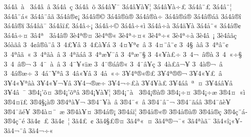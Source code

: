 {3^^e14^^e2^^a0^^e0^^a0
3^^e14^^e2^^a0^^e2
3^^e14^^e2^^a0^^e7
3^^e14^^e2^^a0^^f5
3^^e14^^e2^^a5^^af     
3^^e14^^e2^^a5^^e0^^a5^^a6
3^^e14^^e2^^a5^^e0^^f7^^a3
3^^e14^^e2^^a8^^a3
3^^e14^^e2^^a8^^a6
3^^e14^^e2^^a8^^e1^^ab
3^^e14^^e2^^a8^^e2^^e3
3^^e14^^e2^^ae^^a2^^a1 
3^^e14^^e2^^ae^^a9
3^^e14^^e2^^ae^^e0^^ae^^ad
3^^e14^^e2^^ae^^e0^^f7^^ad
3^^e14^^e2^^ae^^e1^^ae
3^^e14^^e2^^ae^^e1^^e3
3^^e14^^e2^^ae^^ee
3^^e14^^e2^^ae^^ef^^ad 
3^^e14^^e2^^e3^^af
3^^e14^^e2^^ef^^a3
3^^e14^^e2^^f7^^a1
3^^e14^^e2^^f7^^a9
3^^e14^^e2^^f7^^ab^^ec
3^^e14^^e2^^f7^^e0
3^^e14^^e4^^a5^^e0
3^^e14^^e5^^a8^^ab
3^^e14^^e5^^ae^^a2
3^^e14^^e5^^f7^^a4
3^^e24^^aa^^a0^^ad
3^^e54^^e2^^ae
3^^e84^^aa^^ae^^a4
3^^e84^^aa^^ae^^ab
3^^e84^^aa^^f7^^a4^^ab
3^^e84^^aa^^f7^^ab
3^^e84^^aa^^f7^^e0
3^^e84^^e2^^a0^^a1
3^^e84^^e2^^e3^^e7
3^^f3^^e0^^e3^^ad^^e2
3^^a04^^a2^^e2^^ae^^e0^^a8^^e2
3^^a04^^a3^^a5^^ad^^e2
3^^a04^^a3^^e0^^a5^^e1
3^^a04^^a4^^a5^^aa^^a2^^a0^^e2
3^^a04^^a4^^a8^^e2^^a8^^a2
3^^a04^^a7^^a0^^e0^^e2
3^^a04^^aa^^e2^^a8^^a2
3^^a04^^aa^^e2^^e3^^a0^^ab
3^^a04^^aa^^e3^^e0^^a0^^e2
3^^a04^^aa^^e3^^e1^^e2
3^^a04^^aa^^e6^^a5^^af^^e2
3^^a04^^aa^^e6^^a8^^a7
3^^a04^^ab^^a5^^e0^^a3^^f7
3^^a04^^ac^^a0^^e2^^ae^^e0
3^^a04^^ad^^a0^^ab^^f7^^a7
3^^a04^^ad^^a0^^e2^^ae^^ac
3^^a04^^af^^a0^^e0^^a0^^e2
3^^a04^^af^^a5^^ab^^ef^^e6
3^^a04^^af^^ae^^e1^^e2^^ae^^ab
3^^a04^^af^^e2^^a5^^e7
3^^a04^^e0^^a3^^e3^^ac^^a5^^ad
3^^a04^^e0^^ae^^ac^^a0^^e2
3^^a04^^e1^^ae^^e6^^f7
3^^a04^^e1^^af^^a5^^aa^^e2
3^^a04^^e2^^ab^^a5^^e2
3^^a04^^e5^^a0^^ab^^f7
3^^a54^^aa^^ae^^ab^^ae^^a3
3^^a54^^aa^^ae^^ad^^ae^^ac
3^^a54^^ab^^a5^^a3^^a0^^ad^^e2
3^^a54^^ab^^a5^^aa^^e2^^e0
3^^a54^^ab^^a5^^ac^^a5^^ad^^e2
3^^a54^^ac^^ae^^e6^^f7
3^^a54^^ac^^f7^^a3^^e0
3^^a54^^ad^^a5^^e0^^a3
3^^a54^^e1^^e2^^a0^^aa^^a0^^a4
3^^a54^^e1^^e2^^a5^^e2
3^^a54^^e2^^a0^^af
3^^ae4^^a1'^^f5^^a4^^ad
3^^ae4^^a1'^^f5^^aa^^e2
3^^ae4^^a1^^a5^^e0^^a5^^a6
3^^ae4^^a1^^a8^^e0^^a0
3^^ae4^^a1^^ae^^e0^^ae^^ad
3^^ae4^^a1^^f7^^a4
3^^ae4^^a1^^f7^^e6
3^^ae4^^a4^^a0^^ab^^ec  
3^^ae4^^a4^^ef^^a3
3^^ae4^^a7^^a1^^e0^^ae
3^^ae4^^aa^^e0^^a5^^ac
3^^ae4^^af^^a5^^e0^^a0^^e2
3^^ae4^^af^^ab^^a0^^e2
3^^ae4^^af^^e2^^a8^^ac
3^^ae4^^af^^e3^^e1^^e2
3^^ae4^^af^^e3^^e8^^a5
3^^ae4^^af^^e3^^e9^^a5
3^^ae4^^e0^^a4^^a8^^ad^^a0^^e6
3^^ae4^^e0^^a5^^ad^^a4
3^^ae4^^e1^^ae^^a1
3^^ae4^^e1^^ef^^a6^^ad
3^^ae4^^e5^^ae^^ab^^ae
3^^ae4^^e5^^ae^^e0^^ae^^ad
3^^ae4^^e5^^ae^^e7
3^^ae4^^e7^^a8^^e1^^ad
3^^ae4^^e7^^a8^^e9
3^^e34^^a2^^a0^^a3
3^^e34^^a2^^a0^^a6
3^^e34^^a3^^a0^^a2
3^^e34^^a7^^a3^^ae^^a4
3^^e34^^aa^^ab^^a0^^a4
3^^e34^^aa^^ae^^ac^^af^^ab
3^^e34^^aa^^e0^^e3^^af^^ad
3^^e34^^ab^^ee^^a1^^ab^^a5^^ad
3^^e34^^ac^^a8^^e2
3^^e34^^ac^^f7^^ab
}

